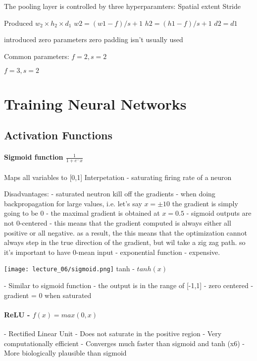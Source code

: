 The pooling layer is controlled by three hyperparamters:
Spatial extent 
Stride 

Produced $w_2 \times h_2 \times d_1$
$w2 = (w1 - f)/s + 1$
$h2 = (h1 - f)/s + 1$
$d2 = d1$

introduced zero parameters
zero padding isn't usually used

Common parameters:
$f=2, s=2 $

$f=3, s=2$

\section{Training Neural Networks}

\subsection{Activation Functions}

\paragraph{Sigmoid function $\frac{1}{1+e^-x}$}
Maps all variables to [0,1]
Interpetation - saturating firing rate of a neuron 

Disadvantages:
- saturated neutron kill off the gradients - when doing backpropagation for large values, i.e. let's say $x = \pm10 $ the gradient is simply going to be 0 
- the maximal gradient is obtained at $x = 0.5$ 
- sigmoid outputs are not 0-centered - this means that the gradient computed is always either all positive or all negative. as a result, the this means that the optimization cannot always step in the true direction of the gradient, but wil take a zig zag path. so it's important to have 0-mean input
- exponential function - expensive.

\texttt{[image: lecture\_06/sigmoid.png]}
tanh - $tanh(x)$ 

- Similar to sigmoid function
- the output is in the range of [-1,1]
- zero centered
- gradient = 0 when saturated

\paragraph{ReLU - $f(x) = max(0,x)$ }

- Rectified Linear Unit
- Does not saturate in the positive region
- Very computationally efficient
- Converges much faster than sigmoid and tanh (x6)
- More biologically plausible than sigmoid

